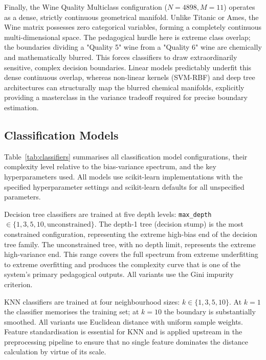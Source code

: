 \documentclass[conference]{IEEEtran}
\begin{document}
Finally, the Wine Quality Multiclass configuration ($N=4898, M=11$) operates as a dense, strictly continuous geometrical manifold. Unlike Titanic or Ames, the Wine matrix possesses zero categorical variables, forming a completely continuous multi-dimensional space. The pedagogical hurdle here is extreme class overlap; the boundaries dividing a "Quality 5" wine from a "Quality 6" wine are chemically and mathematically blurred. This forces classifiers to draw extraordinarily sensitive, complex decision boundaries. Linear models predictably underfit this dense continuous overlap, whereas non-linear kernels (SVM-RBF) and deep tree architectures can structurally map the blurred chemical manifolds, explicitly providing a masterclass in the variance tradeoff required for precise boundary estimation.

\subsection{Classification Models}

Table~\ref{tab:classifiers} summarises all classification model configurations, their complexity level relative to the bias-variance spectrum, and the key hyperparameters used. All models use scikit-learn implementations with the specified hyperparameter settings and scikit-learn defaults for all unspecified parameters.

Decision tree classifiers are trained at five depth levels: \texttt{max\_depth} $\in \{1, 3, 5, 10, \text{unconstrained}\}$. The depth-1 tree (decision stump) is the most constrained configuration, representing the extreme high-bias end of the decision tree family. The unconstrained tree, with no depth limit, represents the extreme high-variance end. This range covers the full spectrum from extreme underfitting to extreme overfitting and produces the complexity curve that is one of the system's primary pedagogical outputs. All variants use the Gini impurity criterion.

KNN classifiers are trained at four neighbourhood sizes: $k \in \{1, 3, 5, 10\}$. At $k=1$ the classifier memorises the training set; at $k=10$ the boundary is substantially smoothed. All variants use Euclidean distance with uniform sample weights. Feature standardisation is essential for KNN and is applied upstream in the preprocessing pipeline to ensure that no single feature dominates the distance calculation by virtue of its scale.
\end{document}
